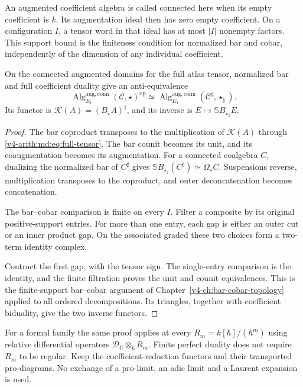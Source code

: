 An augmented coefficient algebra is called connected here
when its empty coefficient is $k$. Its augmentation ideal
then has zero empty coefficient. On a configuration $I$,
a tensor word in that ideal has at most $|I|$ nonempty
factors. This support bound is the finiteness condition for
normalized bar and cobar, independently of the dimension
of any individual coefficient.

\begin{theorem}
\label{v4-arith:md:thm:coefficient-koszul}
On the connected augmented domains for the full atlas
tensor, normalized bar and full coefficient duality give
an anti-equivalence
\[
 \operatorname{Alg}_{E_1}^{\mathrm{aug,conn}}
       (\mathcal C,\star)^{\mathrm{op}}
 \simeq
 \operatorname{Alg}_{E_1}^{\mathrm{aug,conn}}
       (\mathcal C^\sharp,\star_\sharp).
\]
Its functor is $\mathcal K(A)=(B_\star A)^\sharp$, and its
inverse is $E\mapsto\mathbb S B_{\star_\sharp}E$.
\end{theorem}

\begin{proof}
The bar coproduct transposes to the multiplication of
$\mathcal K(A)$ through \eqref{v4-arith:md:eq:full-tensor}.
The bar counit becomes its unit, and its coaugmentation
becomes its augmentation.
For a connected coalgebra $C$, dualizing the normalized
bar of $C^\sharp$ gives
$\mathbb S B_{\star_\sharp}(C^\sharp)\simeq\Omega_\star C$.
Suspensions reverse, multiplication transposes to the
coproduct, and outer deconcatenation becomes concatenation.

The bar--cobar comparison is finite on every $I$.
Filter a composite by its original positive-support entries.
For more than one entry, each gap is either an outer cut or
an inner product gap. On the associated graded these two
choices form a two-term identity complex.

Contract the
first gap, with the tensor sign. The single-entry comparison
is the identity, and the finite filtration proves the unit
and counit equivalences. This is the finite-support
bar--cobar argument of Chapter~\ref{v4-ch:bar-cobar-topology}
applied to all ordered decompositions.
Its triangles, together with coefficient biduality, give
the two inverse functors.
\end{proof}

For a formal family the same proof applies at every
$R_m=k[\hbar]/(\hbar^m)$ using relative differential
operators $\mathcal D_U\otimes_kR_m$.
Finite perfect duality does not require $R_m$ to be regular.
Keep the coefficient-reduction functors and their transported
pro-diagrams. No exchange of a pro-limit, an adic limit and
a Laurent expansion is used.

